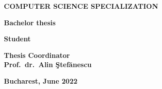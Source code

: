 \documentclass[11pt, a4paper]{report}
\begin{document}
\begin{titlepage}
  \begin{center}
\textbf{COMPUTER SCIENCE SPECIALIZATION}
  \end{center}
  
  \vspace{1cm}
  
  \begin{center}
  \Large \textbf{Bachelor thesis}
  \end{center}
  
  \begin{center}
  \huge \textbf{\MakeUppercase{\@title}}
  \end{center}
  
  \vspace{3cm}
  
  \begin{center}
  \large \textbf{Student \\ \@author}
  \end{center}
  
  \vspace{0.25cm}
  
  \begin{center}
  \large \textbf{Thesis Coordinator \\ Prof.~dr.~Alin \c{S}tef\u{a}nescu}
  \end{center}
  
  \vspace{2cm}
  
  \begin{center}
  \Large \textbf{Bucharest, June 2022}
  \end{center}
\end{titlepage}

\restoregeometry
{}

\addtocounter{page}{1}
\end{document}
